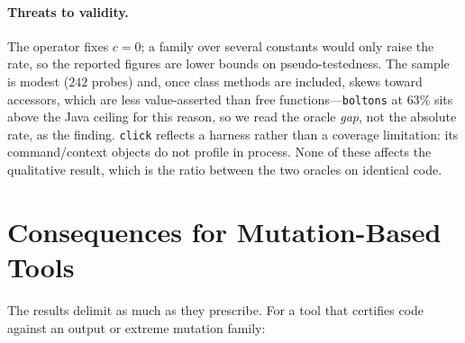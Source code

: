 \documentclass[runningheads,envcountsect,envcountsame]{llncs}
\begin{document}
\paragraph{Threats to validity.}
The operator fixes $c = 0$; a family over several constants would only raise the
rate, so the reported figures are lower bounds on pseudo-testedness. The sample is
modest ($242$ probes) and, once class methods are included, skews toward accessors,
which are less value-asserted than free functions---\texttt{boltons} at $63\%$ sits
above the Java ceiling for this reason, so we read the oracle \emph{gap}, not the
absolute rate, as the finding. \texttt{click} reflects a harness rather than a
coverage limitation: its command/context objects do not profile in process. None of
these affects the qualitative result, which is the ratio between the two oracles on
identical code.

\section{Consequences for Mutation-Based Tools}
\label{sec:tools}

The results delimit as much as they prescribe. For a tool that certifies code
against an output or extreme mutation family:
\end{document}
